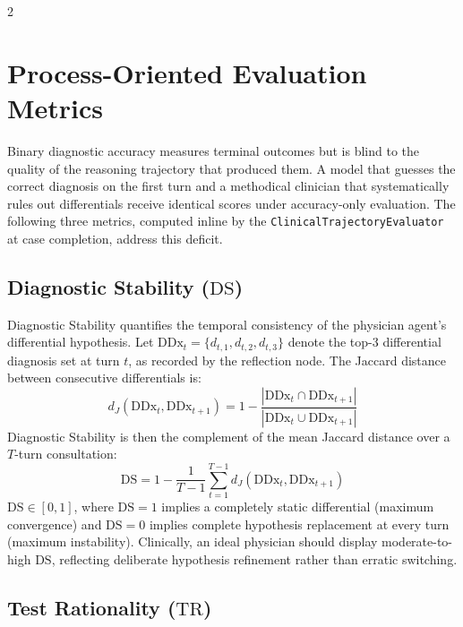 \documentclass[10pt, a4paper]{article}
\newcommand{\DS}{\mathrm{DS}}
\newcommand{\TR}{\mathrm{TR}}
\newcommand{\DDx}{\mathrm{DDx}}
\begin{document}
\begin{multicols}{2}
\section{Process-Oriented Evaluation Metrics}
\label{sec:metrics}

Binary diagnostic accuracy measures terminal outcomes but is blind to the quality of the reasoning trajectory that produced them. A model that guesses the correct diagnosis on the first turn and a methodical clinician that systematically rules out differentials receive identical scores under accuracy-only evaluation. The following three metrics, computed inline by the \texttt{ClinicalTrajectoryEvaluator} at case completion, address this deficit.

\subsection{Diagnostic Stability ($\DS$)}

Diagnostic Stability quantifies the temporal consistency of the physician agent's differential hypothesis. Let $\DDx_t = \{d_{t,1}, d_{t,2}, d_{t,3}\}$ denote the top-3 differential diagnosis set at turn $t$, as recorded by the reflection node. The Jaccard distance between consecutive differentials is:
\begin{equation}
    d_J(\DDx_t, \DDx_{t+1}) = 1 - \frac{|\DDx_t \cap \DDx_{t+1}|}{|\DDx_t \cup \DDx_{t+1}|}
\end{equation}
Diagnostic Stability is then the complement of the mean Jaccard distance over a $T$-turn consultation:
\begin{equation}
    \DS = 1 - \frac{1}{T-1} \sum_{t=1}^{T-1} d_J(\DDx_t, \DDx_{t+1})
\end{equation}
$\DS \in [0, 1]$, where $\DS = 1$ implies a completely static differential (maximum convergence) and $\DS = 0$ implies complete hypothesis replacement at every turn (maximum instability). Clinically, an ideal physician should display moderate-to-high $\DS$, reflecting deliberate hypothesis refinement rather than erratic switching.

\subsection{Test Rationality ($\TR$)}


\end{multicols}
\end{document}
